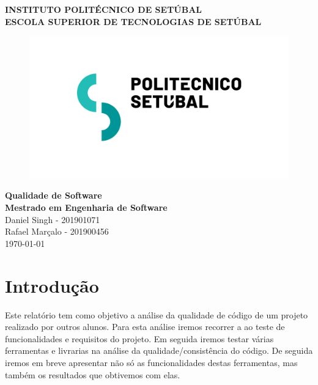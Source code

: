 \documentclass[a4paper,12pt]{article} %
\begin{document}
\begin{titlepage}
	\centering
	\Large \textbf{INSTITUTO POLITÉCNICO DE SETÚBAL} \\
	\normalsize \textbf{ESCOLA SUPERIOR DE TECNOLOGIAS DE SETÚBAL} \\
	\vspace{2cm}
	\begin{figure}[H]
		\centering
		\includegraphics[scale=.5]{images/IPSLogo.png}
	\end{figure}
	\vspace{1cm}
	\Large \textbf{Qualidade de Software}\\
	\Large \textbf{Mestrado em Engenharia de Software}\\
	\vspace{1.5 cm}
	\Large Daniel Singh - 201901071\\
	\Large Rafael Marçalo - 201900456\\
	\vspace{.5cm}
	\large \today
\end{titlepage}

\newpage
\tableofcontents

\newpage
\listoffigures

\newpage
\listoftables

\newpage
\section{Introdução}
Este relatório tem como objetivo a análise da qualidade de código de um projeto realizado por outros alunos. Para esta análise iremos recorrer a ao teste de funcionalidades e requisitos do projeto. Em seguida iremos testar várias ferramentas e livrarias na análise da qualidade/consistência do código. De seguida iremos em breve apresentar não só as funcionalidades destas ferramentas, mas também os resultados que obtivemos com elas.
\end{document}
